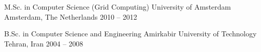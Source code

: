 \begin{cventries}
  \cventry
    {M.Sc. in Computer Science (Grid Computing)}
    {University of Amsterdam}
    {Amsterdam, The Netherlands}
    {2010 -- 2012}
    {}
  \par\vskip 4mm
  \cventry
    {B.Sc. in Computer Science and Engineering}
    {Amirkabir University of Technology}
    {Tehran, Iran}
    {2004 -- 2008}
    {}
\end{cventries}

